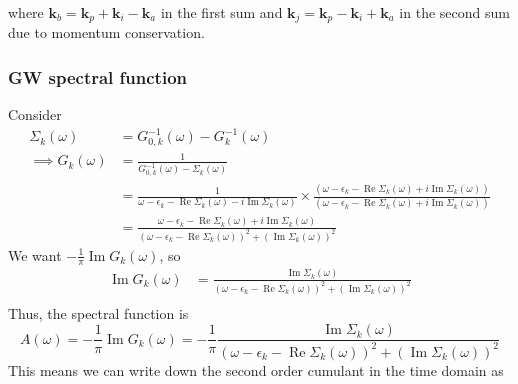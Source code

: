 where $\mathbf{k}_b = \mathbf{k}_p  + \mathbf{k}_i - \mathbf{k}_a$ in the first sum and $\mathbf{k}_j = \mathbf{k}_p - \mathbf{k}_i + \mathbf{k}_a$ in the second sum due to momentum conservation. 
\subsubsection{GW spectral function}
Consider
\begin{align}
    \Sigma_k (\omega ) &= G_{0,k}^{-1}(\omega ) - G_k^{-1}(\omega ) \\
    \implies G_k(\omega ) &= \frac{1}{G_{0,k}^{-1}(\omega ) - \Sigma_k(\omega )} \\
    &= \frac{1}{\omega - \epsilon_k - \operatorname{Re} \Sigma_k (\omega ) - i \operatorname{Im} \Sigma_k (\omega )} \times \frac{\left( \omega - \epsilon_k - \operatorname{Re} \Sigma_k (\omega ) + i \operatorname{Im} \Sigma_k (\omega )\right)}{\left( \omega - \epsilon_k - \operatorname{Re} \Sigma_k (\omega ) + i \operatorname{Im} \Sigma_k (\omega )\right)} \\
    &= \frac{\omega - \epsilon_k - \operatorname{Re} \Sigma_k (\omega ) + i \operatorname{Im} \Sigma_k (\omega )}{\left(\omega - \epsilon_k - \operatorname{Re} \Sigma_k (\omega )\right)^2 + \left(\operatorname{Im} \Sigma_k (\omega )\right)^2}
\end{align}
We want $-\frac{1}{\pi} \operatorname{Im} G_k(\omega )$, so
\begin{align}
    \operatorname{Im} G_k(\omega ) &= \frac{\operatorname{Im} \Sigma_k (\omega )}{\left(\omega - \epsilon_k - \operatorname{Re} \Sigma_k (\omega )\right)^2 + \left(\operatorname{Im} \Sigma_k (\omega )\right)^2} \\
\end{align}
Thus, the spectral function is
\begin{equation}
    A(\omega ) = -\frac{1}{\pi} \operatorname{Im} G_k(\omega ) = -\frac{1}{\pi} \frac{\operatorname{Im} \Sigma_k (\omega )}{\left(\omega - \epsilon_k - \operatorname{Re} \Sigma_k (\omega )\right)^2 + \left(\operatorname{Im} \Sigma_k (\omega )\right)^2}
\end{equation}
This means we can write down the second order cumulant in the time domain as
